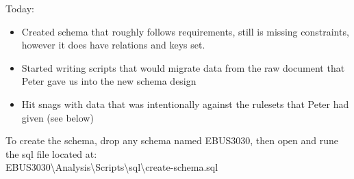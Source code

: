 \documentclass{article}
\begin{document}
    Today:
    \begin{itemize}
        \item Created schema that roughly follows requirements, still is missing constraints,
        however it does have relations and keys set.
        \item Started writing scripts that would migrate data from the raw document that Peter
        gave us into the new schema design
        \item Hit snags with data that was intentionally against the rulesets that Peter had given (see below)
    \end{itemize}

    To create the schema, drop any schema named EBUS3030, then open and rune the sql 
    file located at:
    \\
    EBUS3030\textbackslash Analysis\textbackslash Scripts\textbackslash sql\textbackslash create-schema.sql
\end{document}
